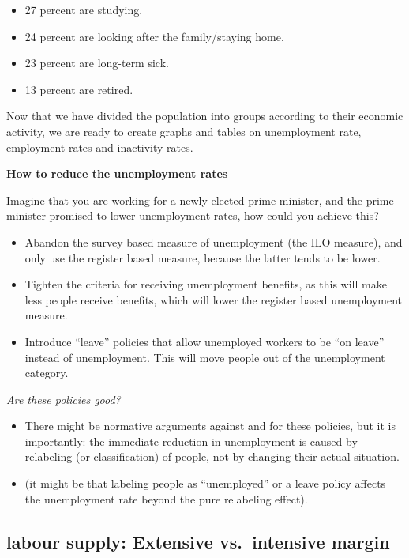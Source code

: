 \documentclass[
]{book}
\providecommand{\tightlist}{%
  \setlength{\itemsep}{0pt}\setlength{\parskip}{0pt}}
\begin{document}
\begin{itemize}
\tightlist
\item
  27 percent are studying.
\item
  24 percent are looking after the family/staying home.
\item
  23 percent are long-term sick.
\item
  13 percent are retired.
\end{itemize}

Now that we have divided the population into groups according to their economic activity, we are ready to create graphs and tables on unemployment rate, employment rates and inactivity rates.

\begin{myblock}
\textbf{How to reduce the unemployment rates}

Imagine that you are working for a newly elected prime minister, and the
prime minister promised to lower unemployment rates, how could you
achieve this?

\begin{itemize}
\item
  Abandon the survey based measure of unemployment (the ILO measure),
  and only use the register based measure, because the latter tends to
  be lower.
\item
  Tighten the criteria for receiving unemployment benefits, as this will
  make less people receive benefits, which will lower the register based
  unemployment measure.
\item
  Introduce ``leave'' policies that allow unemployed workers to be ``on
  leave'' instead of unemployment. This will move people out of the
  unemployment category.
\end{itemize}

\emph{Are these policies good?}

\begin{itemize}
\tightlist
\item
  There might be normative arguments against and for these policies, but
  it is importantly: the immediate reduction in unemployment is caused
  by relabeling (or classification) of people, not by changing their
  actual situation.
\item
  (it might be that labeling people as ``unemployed'' or a leave policy
  affects the unemployment rate beyond the pure relabeling effect).
\end{itemize}
\end{myblock}

\hypertarget{labour-supply-extensive-vs.-intensive-margin}{%
\subsection*{labour supply: Extensive vs.~intensive margin}\label{labour-supply-extensive-vs.-intensive-margin}}
\end{document}
